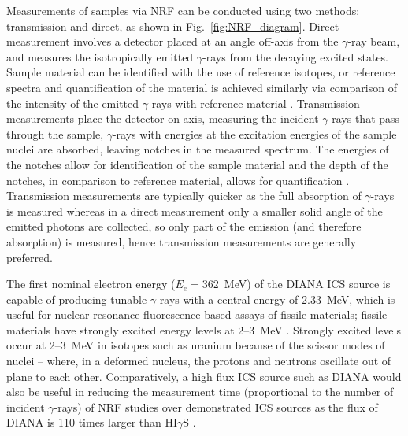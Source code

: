 \documentclass[../main.tex]{subfiles}
\begin{document}
Measurements of samples via NRF can be conducted using two methods: transmission and direct, as shown in Fig.~\ref{fig:NRF_diagram}. Direct measurement involves a detector placed at an angle off-axis from the $\gamma$-ray beam, and measures the isotropically emitted $\gamma$-rays from the decaying excited states. Sample material can be identified with the use of reference isotopes, or reference spectra and quantification of the material is achieved similarly via comparison of the intensity of the emitted $\gamma$-rays with reference material \cite{angell2015demonstration}. Transmission measurements place the detector on-axis, measuring the incident $\gamma$-rays that pass through the sample, $\gamma$-rays with energies at the excitation energies of the sample nuclei are absorbed, leaving notches in the measured spectrum. The energies of the notches allow for identification of the sample material and the depth of the notches, in comparison to reference material, allows for quantification \cite{pruet2006detecting}. Transmission measurements are typically quicker as the full absorption of $\gamma$-rays is measured whereas in a direct measurement only a smaller solid angle of the emitted photons are collected, so only part of the emission (and therefore absorption) is measured, hence transmission measurements are generally preferred.

The first nominal electron energy ($E_{e} = 362$~\si{\mega\electronvolt}) of the DIANA ICS source is capable of producing tunable $\gamma$-rays with a central energy of 2.33~\si{\mega\electronvolt}, which is useful for nuclear resonance fluorescence based assays of fissile materials; fissile materials have strongly excited energy levels at 2--3~\si{\mega\electronvolt} \cite{angell2015demonstration}. Strongly excited levels occur at 2--3~\si{\mega\electronvolt} in isotopes such as uranium because of the scissor modes of nuclei \cite{iudice1978new,bohle1984new} -- where, in a deformed nucleus, the protons and neutrons oscillate out of plane to each other. Comparatively, a high flux ICS source such as DIANA would also be useful in reducing the measurement time (proportional to the number of incident $\gamma$-rays) of NRF studies over demonstrated ICS sources as the flux of DIANA is 110 times larger than HI$\gamma$S \cite{weller2009research}.
\end{document}
